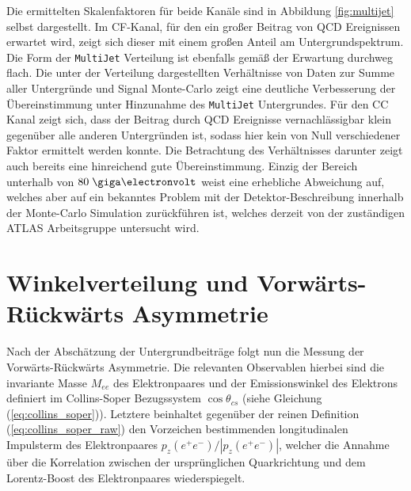 Die ermittelten Skalenfaktoren für beide Kanäle sind in Abbildung
\ref{fig:multijet} selbst dargestellt. Im \ac{CF}-Kanal, für den ein großer
Beitrag von \ac{QCD} Ereignissen erwartet wird, zeigt sich dieser mit einem
großen Anteil am Untergrundspektrum. Die Form der \texttt{MultiJet} Verteilung
ist ebenfalls gemäß der Erwartung durchweg flach. Die unter der Verteilung
dargestellten Verhältnisse von Daten zur Summe aller Untergründe und
Signal Monte-Carlo zeigt eine deutliche Verbesserung der Übereinstimmung unter
Hinzunahme des \texttt{MultiJet} Untergrundes. Für den \ac{CC} Kanal zeigt
sich, dass der Beitrag durch \ac{QCD} Ereignisse vernachlässigbar klein
gegenüber alle anderen Untergründen ist, sodass hier kein von Null
verschiedener Faktor ermittelt werden konnte. Die Betrachtung des Verhältnisses
darunter zeigt auch bereits eine hinreichend gute Übereinstimmung.  Einzig der
Bereich unterhalb von $80\GeV$ weist eine erhebliche Abweichung auf, welches
aber auf ein bekanntes Problem mit der Detektor-Beschreibung innerhalb der
Monte-Carlo Simulation zurückführen ist, welches derzeit von der zuständigen
ATLAS Arbeitsgruppe untersucht wird.



\section{Winkelverteilung und Vorwärts-Rückwärts Asymmetrie}
\label{afb:afb}


Nach der Abschätzung der Untergrundbeiträge folgt nun die Messung der
Vorwärts-Rückwärts Asymmetrie. Die relevanten Observablen hierbei sind die
invariante Masse $M_{ee}$ des Elektronpaares und der Emissionswinkel des
Elektrons definiert im Collins-Soper Bezugssystem $\cos\theta_{cs}$ (siehe
Gleichung (\ref{eq:collins_soper})). Letztere beinhaltet gegenüber der reinen
Definition (\ref{eq:collins_soper_raw}) den Vorzeichen bestimmenden
longitudinalen Impulsterm des Elektronpaares $p_z(e^+e^-)/|p_z(e^+e^-)|$,
welcher die Annahme über die Korrelation zwischen der ursprünglichen
Quarkrichtung und dem Lorentz-Boost des Elektronpaares wiederspiegelt. 



